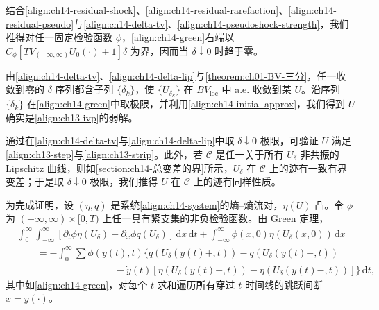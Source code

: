 \documentclass[../../main.tex]{subfiles}
\begin{document}
结合\eqref{align:ch14-residual-shock}、\eqref{align:ch14-residual-rarefaction}、\eqref{align:ch14-residual-pseudo}与\eqref{align:ch14-delta-tv}、\eqref{align:ch14-pseudoshock-strength}，我们推得对任一固定检验函数 $\phi$，\eqref{align:ch14-green}右端以 $C_\phi[TV_{(-\infty,\infty)}U_0(\cdot)+1]\delta$ 为界，因而当 $\delta\downarrow0$ 时趋于零。

由\eqref{align:ch14-delta-tv}、\eqref{align:ch14-delta-lip}与\cref{theorem:ch01-BV-三分}，任一收敛到零的 $\delta$ 序列都含子列 $\{\delta_k\}$，使 $\{U_{\delta_k}\}$ 在 $BV_{\mathrm{loc}}$ 中 a.e. 收敛到某 $U$。沿序列 $\{\delta_k\}$ 在\eqref{align:ch14-green}中取极限，并利用\eqref{align:ch14-initial-approx}，我们得到 $U$ 确实是\eqref{align:ch13-ivp}的弱解。



通过在\eqref{align:ch14-delta-tv}与\eqref{align:ch14-delta-lip}中取 $\delta\downarrow0$ 极限，可验证 $U$ 满足\eqref{align:ch13-step}与\eqref{align:ch13-strip}。此外，若 $\mathscr{C}$ 是任一关于所有 $U_\delta$ 非共振的 Lipschitz 曲线，则如\cref{section:ch14-总变差的界}所示，$U_\delta$ 在 $\mathscr{C}$ 上的迹有一致有界变差；于是取 $\delta\downarrow0$ 极限，我们推得 $U$ 在 $\mathscr{C}$ 上的迹有同样性质。



为完成证明，设 $(\eta,q)$ 是系统\eqref{align:ch14-system}的熵--熵流对，$\eta(U)$ 凸。令 $\phi$ 为 $(-\infty,\infty)\times[0,T)$ 上任一具有紧支集的非负检验函数。由 Green 定理，
\begin{align}
&\int_0^\infty\int_{-\infty}^\infty[\partial_t\phi\eta(U_\delta)+\partial_x\phi q(U_\delta)]\,\mathrm{d}x\,\mathrm{d}t+\int_{-\infty}^\infty\phi(x,0)\eta(U_\delta(x,0))\,\mathrm{d}x\nonumber\\
&\qquad=-\int_0^\infty\sum\phi(y(t),t)\{q(U_\delta(y(t)+,t))-q(U_\delta(y(t)-,t))\nonumber\\
&\qquad\qquad\qquad\qquad\qquad-\dot y(t)[\eta(U_\delta(y(t)+,t))-\eta(U_\delta(y(t)-,t))]\}\,\mathrm{d}t,
\label{align:ch14-entropy-green}
\end{align}
其中如\eqref{align:ch14-green}，对每个 $t$ 求和遍历所有穿过 $t$-时间线的跳跃间断 $x=y(\cdot)$。
\end{document}
